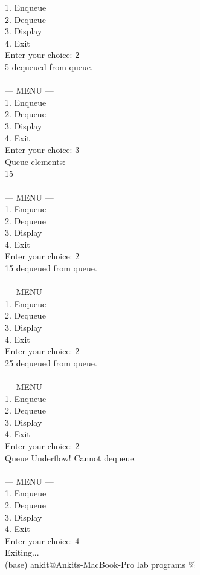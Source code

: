 \documentclass[12pt,a4paper]{article}
\begin{document}
\begin{tcolorbox}[terminalstyle, title=Sample Output]
{1. Enqueue\\
2. Dequeue\\
3. Display\\
4. Exit\\
Enter your choice: 2\\
5 dequeued from queue.\\
\\
--- MENU ---\\
1. Enqueue\\
2. Dequeue\\
3. Display\\
4. Exit\\
Enter your choice: 3\\
Queue elements:\\
15 \\
\\
--- MENU ---\\
1. Enqueue\\
2. Dequeue\\
3. Display\\
4. Exit\\
Enter your choice: 2\\
15 dequeued from queue.\\
\\
--- MENU ---\\
1. Enqueue\\
2. Dequeue\\
3. Display\\
4. Exit\\
Enter your choice: 2\\
25 dequeued from queue.\\
\\
--- MENU ---\\
1. Enqueue\\
2. Dequeue\\
3. Display\\
4. Exit\\
Enter your choice: 2\\
Queue Underflow! Cannot dequeue.\\
\\
--- MENU ---\\
1. Enqueue\\
2. Dequeue\\
3. Display\\
4. Exit\\
Enter your choice: 4\\
Exiting...\\
(base) ankit@Ankits-MacBook-Pro lab programs \%
}
\end{tcolorbox}
\end{document}
